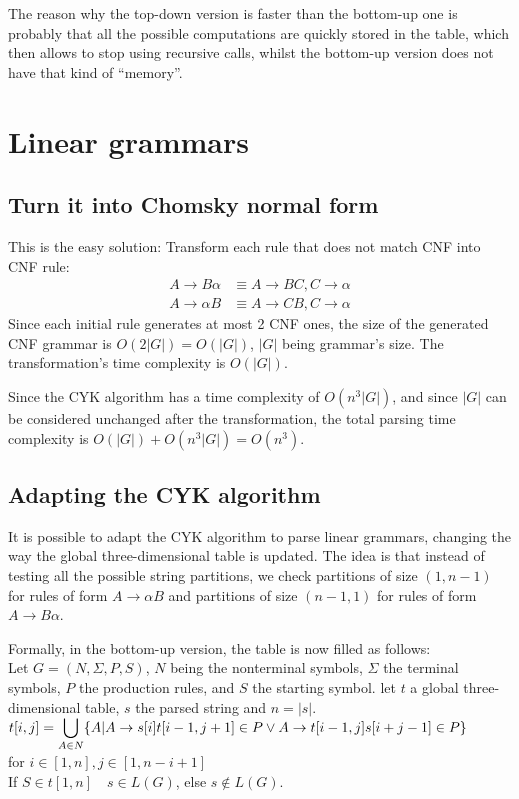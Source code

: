 \documentclass[]{article}
\begin{document}
\begin{multicols}{2}
The reason why the top-down version is faster than the bottom-up one is probably
that all the possible
computations are quickly stored in the table, which then allows to stop using
recursive calls, whilst the bottom-up version does not have that kind of ``memory''.


\newpage
\section{Linear grammars}
\subsection{Turn it into Chomsky normal form}
This is the easy solution: Transform each rule that does not match CNF into CNF
rule:
\begin{align*}
  A\rightarrow B\alpha&\equiv A\rightarrow BC,C\rightarrow\alpha \\
  A\rightarrow\alpha B&\equiv A\rightarrow CB,C\rightarrow\alpha
\end{align*}
Since each initial rule generates at most 2 CNF ones, the size of the generated
CNF grammar is $O(2|G|)=O(|G|)$, $|G|$ being grammar's size. The transformation's time complexity is $O(|G|)$.

Since the CYK algorithm has a time complexity of $O(n^3|G|)$, and since $|G|$ can be considered unchanged after the transformation, the total parsing time complexity is $O(|G|)+O(n^3|G|)=O(n^3)$.

\subsection{Adapting the CYK algorithm}
It is possible to adapt the CYK algorithm to parse linear grammars, changing the way the global three-dimensional table is updated. The idea is that instead of testing all the possible string partitions, we check partitions of size $(1, n-1)$ for rules of form $A\rightarrow\alpha B$ and partitions of size $(n-1,1)$ for rules of form $A\rightarrow B\alpha$.

Formally, in the bottom-up version, the table is now filled as follows:\\
Let $G=(N,\Sigma,P,S)$, $N$ being the nonterminal symbols, $\Sigma$ the terminal symbols, $P$ the production rules, and $S$ the starting symbol. let $t$ a global three-dimensional table, $s$ the parsed string and $n = |s|$.\\
$t[i,j]=\displaystyle\bigcup_{A\in N}\{A|A\rightarrow s[i]t[i-1,j+1]\in P\newline\lor A \rightarrow t[i-1,j]s[i+j-1] \in P\}$\\for $i\in [1,n],j \in [1, n-i+1]$\\
If $S \in t[1,n]\quad s \in L(G)$, else $s \notin L(G)$.


\end{multicols}
\end{document}
